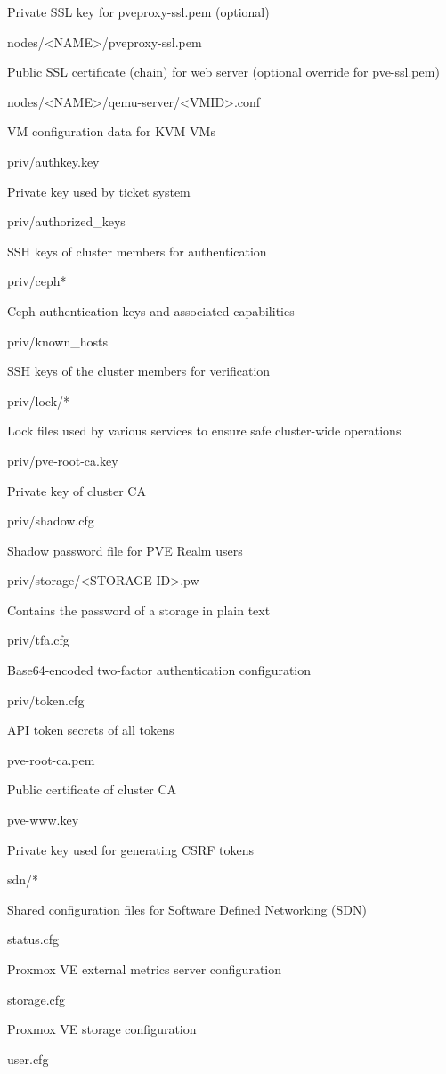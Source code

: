 Private SSL key for pveproxy-ssl.pem (optional)

nodes/<NAME>/pveproxy-ssl.pem

Public SSL certificate (chain) for web server (optional override for pve-ssl.pem)

nodes/<NAME>/qemu-server/<VMID>.conf

VM configuration data for KVM VMs

priv/authkey.key

Private key used by ticket system

priv/authorized_keys

SSH keys of cluster members for authentication

priv/ceph*

Ceph authentication keys and associated capabilities

priv/known_hosts

SSH keys of the cluster members for verification

priv/lock/*

Lock files used by various services to ensure safe cluster-wide operations

priv/pve-root-ca.key

Private key of cluster CA

priv/shadow.cfg

Shadow password file for PVE Realm users

priv/storage/<STORAGE-ID>.pw

Contains the password of a storage in plain text

priv/tfa.cfg

Base64-encoded two-factor authentication configuration

priv/token.cfg

API token secrets of all tokens

pve-root-ca.pem

Public certificate of cluster CA

pve-www.key

Private key used for generating CSRF tokens

sdn/*

Shared configuration files for Software Defined Networking (SDN)

status.cfg

Proxmox VE external metrics server configuration

storage.cfg

Proxmox VE storage configuration

user.cfg

